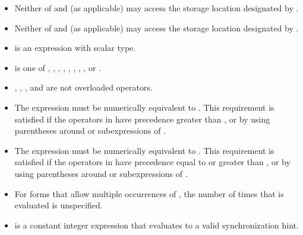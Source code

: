\begin{ccppspecific}
\begin{itemize}
\item Neither of  and  (as applicable) may access the storage location designated by .

\item Neither of  and  (as applicable) may access the storage location designated by .

\item {} is an expression with scalar type.

\item {} is one of \code{+}, \code{*}, \code{-}, \code{/},
\code{&}, \code{^}, \code{|}, \code{<<}, or
\code{>>}.

\item {}, \code{=}, \code{++}, and \code{--} are not overloaded operators.

\item The expression    must be numerically equivalent to
  . This
requirement is satisfied if the operators in  have precedence greater than ,
or by using parentheses around  or subexpressions of .

\item The expression    must be numerically equivalent to
  . This
requirement is satisfied if the operators in  have precedence equal to or greater
than , or by using parentheses around  or subexpressions of .

\item For forms that allow multiple occurrences of , the number of times that  is
evaluated is unspecified.

\item {} is a constant integer expression that evaluates to a valid synchronization
hint.
\end{itemize}

\end{ccppspecific}

